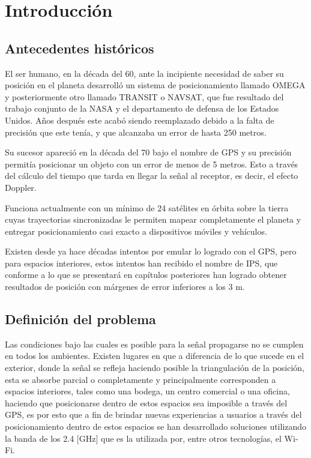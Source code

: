 \chapter{Introducción}

\section{Antecedentes históricos}
El ser humano, en la década del 60, ante la incipiente necesidad de saber su posición en el planeta desarrolló un sistema de posicionamiento  llamado OMEGA y posteriormente otro llamado TRANSIT o \ac{NAVSAT}, que  fue resultado del trabajo conjunto de la NASA y el departamento de defensa de los Estados Unidos. Años después este acabó siendo reemplazado debido a la falta de precisión que este tenía, y que alcanzaba un error de hasta 250 metros.

Su sucesor apareció en la década del 70 bajo el nombre de \ac{GPS} y su precisión permitía posicionar un objeto con un error de menos de 5 metros. Esto a través del cálculo del tiempo que tarda en llegar la señal al receptor, es decir, el efecto Doppler.

Funciona actualmente con un mínimo de 24 satélites en órbita sobre la tierra cuyas trayectorias sincronizadas le permiten mapear completamente el planeta y entregar posicionamiento casi exacto a dispositivos móviles y vehículos.

Existen desde ya hace décadas intentos por emular lo logrado con el GPS, pero para espacios interiores, estos intentos han recibido el nombre de \ac{IPS}, que conforme a lo que se presentará en capítulos posteriores han logrado obtener resultados de posición con márgenes de error inferiores a los 3 m. 

\section{Definición del problema}
Las condiciones bajo las cuales es posible para la señal propagarse no se cumplen en todos los ambientes. Existen lugares en que a diferencia de lo que sucede en el exterior, donde la señal se refleja haciendo posible la triangulación de la posición, esta se absorbe parcial o completamente y principalmente corresponden a espacios interiores, tales como una bodega, un centro comercial o una oficina, haciendo que posicionarse dentro de estos espacios sea imposible a través del GPS, es por esto que a fin de brindar nuevas experiencias a usuarios a través del posicionamiento dentro de estos espacios se han desarrollado soluciones utilizando la banda de los 2.4 [GHz] que es la utilizada por, entre otros tecnologías, el Wi-Fi. 

